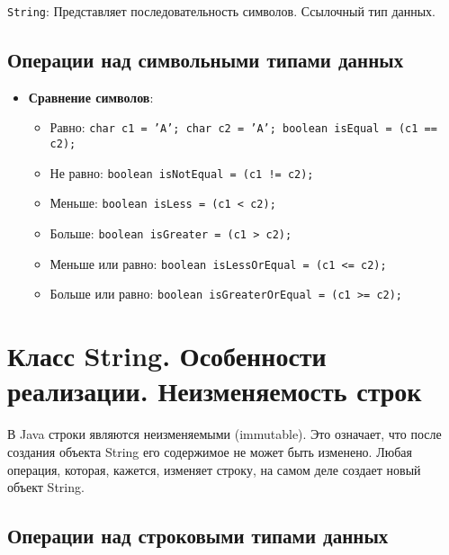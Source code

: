 \documentclass[12pt, a4paper]{article}
\begin{document}
\texttt{String}: Представляет последовательность символов. Ссылочный тип данных.

\subsection*{Операции над символьными типами данных}

\begin{itemize}
    \item \textbf{Сравнение символов}:
    \begin{itemize}
        \item Равно: \texttt{char c1 = 'A'; char c2 = 'A'; boolean isEqual = (c1 == c2);}
        \item Не равно: \texttt{boolean isNotEqual = (c1 != c2);}
        \item Меньше: \texttt{boolean isLess = (c1 < c2);}
        \item Больше: \texttt{boolean isGreater = (c1 > c2);}
        \item Меньше или равно: \texttt{boolean isLessOrEqual = (c1 <= c2);}
        \item Больше или равно: \texttt{boolean isGreaterOrEqual = (c1 >= c2);}
    \end{itemize}
\end{itemize}


\section{Класс String. Особенности реализации. Неизменяемость строк}

В Java строки являются неизменяемыми (immutable). Это означает, что после создания объекта String его содержимое не может быть изменено. Любая операция, которая, кажется, изменяет строку, на самом деле создает новый объект String.

\subsection*{Операции над строковыми типами данных}
\end{document}

